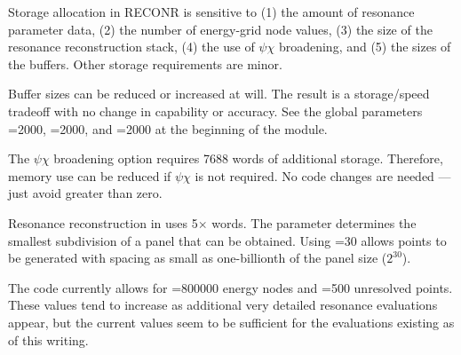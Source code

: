 Storage allocation in RECONR is sensitive to (1) the amount of
resonance parameter data, (2) the number of energy-grid node
values, (3) the size of the resonance reconstruction stack,
(4) the use of $\psi\chi$ broadening, and  (5) the sizes of the  buffers.
Other storage requirements are minor.

Buffer sizes can be reduced or increased at will.  The result is
a storage/speed tradeoff with no change in capability or accuracy.
See the global parameters =2000, =2000,
and =2000 at the beginning of the  module.

The $\psi\chi$ broadening option requires 7688 words of
additional storage.  Therefore, memory use can be reduced
if $\psi\chi$ is not required.  No code changes
are needed --- just avoid  greater than zero.

Resonance reconstruction in  uses
5${\times}$ words.  The parameter 
determines the smallest subdivision of a panel that can be
obtained.  Using =30 allows points to be generated
with spacing as small as one-billionth of the panel size
($2^{30}$).

The code currently allows for =800000 energy nodes
and =500 unresolved points.  These values tend to
increase as additional very detailed resonance evaluations appear,
but the current values seem to be sufficient for the evaluations
existing as of this writing.

\cleardoublepage


